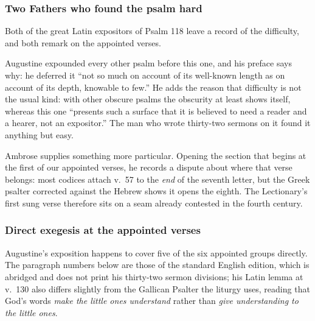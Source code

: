 \subsubsection*{Two Fathers who found the psalm hard}

Both of the great Latin expositors of Psalm 118 leave a record of the difficulty, and both remark on the appointed verses.

Augustine expounded every other psalm before this one, and his preface says why: he deferred it ``not so much on account of its well-known length as on account of its depth, knowable to few.'' He adds the reason that difficulty is not the usual kind: with other obscure psalms the obscurity at least shows itself, whereas this one ``presents such a surface that it is believed to need a reader and a hearer, not an expositor.'' The man who wrote thirty-two sermons on it found it anything but easy.

Ambrose supplies something more particular. Opening the section that begins at the first of our appointed verses, he records a dispute about where that verse belongs: most codices attach v.~57 to the \emph{end} of the seventh letter, but the Greek psalter corrected against the Hebrew shows it opens the eighth. The Lectionary's first sung verse therefore sits on a seam already contested in the fourth century.

\subsubsection*{Direct exegesis at the appointed verses}

Augustine's exposition happens to cover five of the six appointed groups directly. The paragraph numbers below are those of the standard English edition, which is abridged and does not print his thirty-two sermon divisions; his Latin lemma at v.~130 also differs slightly from the Gallican Psalter the liturgy uses, reading that God's words \emph{make the little ones understand} rather than \emph{give understanding to the little ones}.

